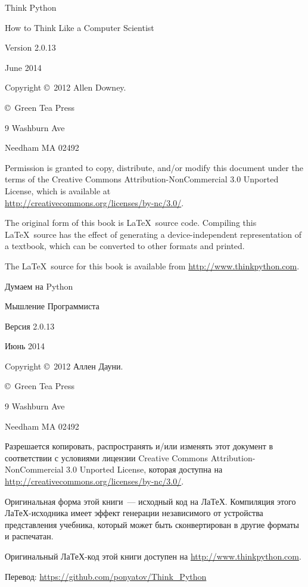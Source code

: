 \maketitle

\begin{titlepage}
Think Python
\bigskip

How to Think Like a Computer Scientist
\bigskip

Version 2.0.13
\bigskip

June 2014
\bigskip

Copyright \copyright\ 2012 Allen Downey.
\bigskip

\copyright\ Green Tea Press 

9 Washburn Ave 

Needham MA 02492 
\bigskip

 Permission is granted to copy, distribute, and/or modify this document under the
terms of the Creative Commons Attribution-NonCommercial 3.0 Unported License,
which is available at\\ \url{http://creativecommons.org/licenses/by-nc/3.0/}.
\bigskip

The original form of this book is \LaTeX\ source code. Compiling this \LaTeX\
source has the effect of generating a device-independent representation of a textbook,
which can be converted to other formats and printed.
\bigskip

The \LaTeX\ source for this book is available from
\url{http://www.thinkpython.com}.

\end{titlepage}

\begin{titlepage}
Думаем на Python
\bigskip

Мышление Программиста
\bigskip

Версия 2.0.13
\bigskip

Июнь 2014
\bigskip

Copyright \copyright\ 2012 Аллен Дауни.
\bigskip

\copyright\ Green Tea Press 

9 Washburn Ave 

Needham MA 02492 
\bigskip

Разрешается копировать, распространять и/или изменять этот документ в
соответствии с условиями лицензии Creative Commons Attribution-NonCommercial 3.0
Unported License, которая доступна на
\url{http://creativecommons.org/licenses/by-nc/3.0/}.
\bigskip

Оригинальная форма этой книги\ --- исходный код на ЛаТеХ.
Компиляция этого ЛаТеХ-исходника имеет эффект генерации независимого от
устройства представления учебника, который может быть сконвертирован в другие
форматы и распечатан.
\bigskip

Оригинальный ЛаТеХ-код этой книги доступен на \url{http://www.thinkpython.com}.

\bigskip
Перевод: \url{https://github.com/ponyatov/Think_Python}

\end{titlepage}
